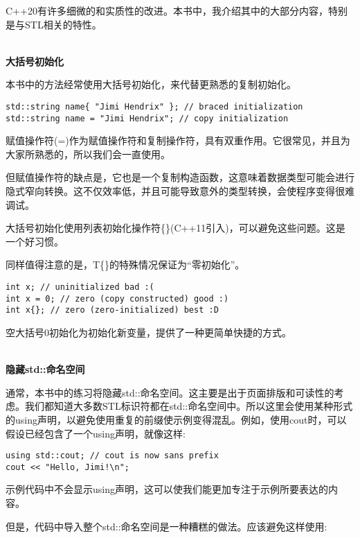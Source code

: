 C++20有许多细微的和实质性的改进。本书中，我介绍其中的大部分内容，特别是与STL相关的特性。

\hspace*{\fill} \\ %
\noindent
\textbf{大括号初始化}

本书中的方法经常使用大括号初始化，来代替更熟悉的复制初始化。

\begin{lstlisting}[style=styleCMake]
std::string name{ "Jimi Hendrix" }; // braced initialization
std::string name = "Jimi Hendrix"; // copy initialization
\end{lstlisting}

赋值操作符(=)作为赋值操作符和复制操作符，具有双重作用。它很常见，并且为大家所熟悉的，所以我们会一直使用。

但赋值操作符的缺点是，它也是一个复制构造函数，这意味着数据类型可能会进行隐式窄向转换。这不仅效率低，并且可能导致意外的类型转换，会使程序变得很难调试。

大括号初始化使用列表初始化操作符\{\}(C++11引入)，可以避免这些问题。这是一个好习惯。

同样值得注意的是，T\{\}的特殊情况保证为“零初始化”。

\begin{lstlisting}[style=styleCXX]
int x; // uninitialized bad :(
int x = 0; // zero (copy constructed) good :)
int x{}; // zero (zero-initialized) best :D
\end{lstlisting}

空大括号0初始化为初始化新变量，提供了一种更简单快捷的方式。

\hspace*{\fill} \\ %
\noindent
\textbf{隐藏std::命名空间}

通常，本书中的练习将隐藏std::命名空间。这主要是出于页面排版和可读性的考虑。我们都知道大多数STL标识符都在std::命名空间中。所以这里会使用某种形式的using声明，以避免使用重复的前缀使示例变得混乱。例如，使用cout时，可以假设已经包含了一个using声明，就像这样:

\begin{lstlisting}[style=styleCXX]
using std::cout; // cout is now sans prefix
cout << "Hello, Jimi!\n";
\end{lstlisting}

示例代码中不会显示using声明，这可以使我们能更加专注于示例所要表达的内容。

但是，代码中导入整个std::命名空间是一种糟糕的做法。应该避免这样使用:

